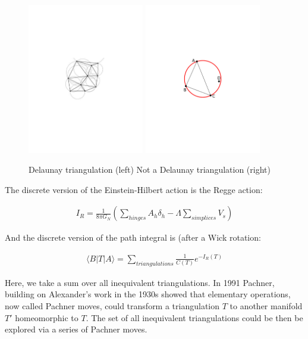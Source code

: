 \documentclass[12pt]{article}
\begin{document}
\begin{figure}
  \begin{center}
  \includegraphics[width=2in]{DT1.pdf}
   \includegraphics[width=2in]{NDT.pdf}
  \caption{Delaunay triangulation (left) Not a Delaunay triangulation (right) \label{DT}}
  \end{center}
\end{figure}

The discrete version of the Einstein-Hilbert action is the Regge action:

\begin{align}
  I_{R}=\frac{1}{8\pi G_{N}}\left(\sum\limits_{hinges}A_{h}\delta_{h}-\Lambda\sum\limits_{simplices}V_{s}\right)\label{equation:Regge-Action}
\end{align}

And the discrete version of the path integral is (after a Wick rotation:

\begin{align}
  \langle B|T|A\rangle=\sum\limits_{triangulations}\frac{1}{C(T)}e^{-I_{R}(T)} \label{CDT1}
\end{align}

Here, we take a sum over all inequivalent triangulations. In 1991 Pachner\cite{pachner_p.l._1991}, building on Alexander's work in the 1930s\cite{alexander_combinatorial_1930}
showed that elementary operations, now called Pachner moves, could transform a triangulation $T$ to another manifold $T'$ homeomorphic to $T$. The set of all inequivalent triangulations could be then be explored via a series of Pachner moves.\cite{gross_elementary_1992}
\end{document}
